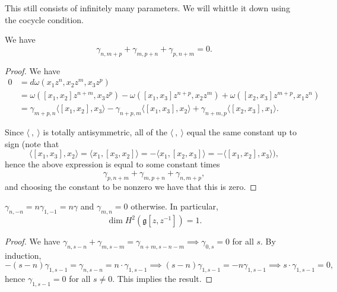 \documentclass[12pt]{article}
\begin{document}
This still consists of infinitely many parameters. We will whittle it down using the cocycle condition.

\begin{proposition}
    We have
    \[
        \gamma_{n,m+p} + \gamma_{m,p+n} + \gamma_{p,n+m} = 0.
    \]
\end{proposition}

\begin{proof}
    We have
    \begin{align*}
        0 & = d\omega(x_1 z^n, x_2 z^m, x_3 z^p)            \\
          & = \omega([x_1,x_2]z^{n+m}, x_3 z^p)
        - \omega([x_1,x_3] z^{n+p}, x_2 z^m)
        + \omega([x_2,x_3] z^{m+p}, x_1 z^n)                \\
          & = \gamma_{m+p,n} \langle [x_1,x_2], x_3 \rangle
        - \gamma_{n+p,m} \langle [x_1,x_3], x_2 \rangle
        + \gamma_{n+m,p} \langle [x_2,x_3], x_1 \rangle.
    \end{align*}

    Since $\langle \ ,\ \rangle$ is totally antisymmetric, all of the $\langle \ ,\ \rangle$ equal the same constant up to sign (note that
    \[
        \langle [x_1,x_3], x_2\rangle = \langle x_1, [x_3,x_2]\rangle
        = -\langle x_1, [x_2,x_3]\rangle
        = -\langle [x_1,x_2], x_3\rangle),
    \]
    hence the above expression is equal to some constant times
    \[
        \gamma_{p,n+m} + \gamma_{m,p+n} + \gamma_{n,m+p},
    \]
    and choosing the constant to be nonzero we have that this is zero.
\end{proof}

\begin{corollary}
    $\gamma_{n,-n} = n\gamma_{1,-1} = n\gamma$ and $\gamma_{m,n} = 0$ otherwise. In particular,
    \[
        \dim H^2(\mathfrak{g}[z,z^{-1}]) = 1.
    \]
\end{corollary}

\begin{proof}
    We have $\gamma_{n,s-n} + \gamma_{m,s-m} = \gamma_{n+m,s-n-m} \implies \gamma_{0,s} = 0$ for all $s$. By induction,
    \[
        -(s-n)\gamma_{1,s-1} = \gamma_{n,s-n} = n \cdot \gamma_{1,s-1} \implies (s-n)\gamma_{1,s-1} = -n\gamma_{1,s-1}
        \implies s \cdot \gamma_{1,s-1} = 0,
    \]
    hence $\gamma_{1,s-1} = 0$ for all $s \neq 0$. This implies the result.
\end{proof}
\end{document}
